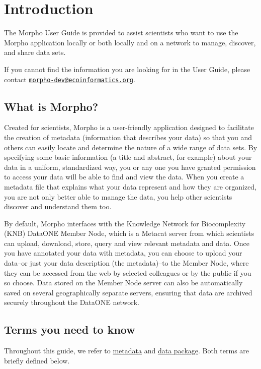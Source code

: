 \section{Introduction}

The Morpho User Guide is provided to assist scientists who want to use
the Morpho application locally or both locally and on a network to
manage, discover, and share data sets.

If you cannot find the information you are looking for in the User
Guide, please contact \href{mailto:morpho-dev@ecoinformatics.org}
{\nolinkurl{morpho-dev@ecoinformatics.org}}.

\subsection{What is Morpho?}

Created for scientists, Morpho is a user-friendly application designed
to facilitate the creation of metadata (information that describes your
data) so that you and others can easily locate and determine the nature
of a wide range of data sets. By specifying some basic information (a
title and abstract, for example) about your data in a uniform,
standardized way, you or any one you have granted permission to access
your data will be able to find and view the data. When you create a
metadata file that explains what your data represent and how they are
organized, you are not only better able to manage the data, you help
other scientists discover and understand them too. 

By default, Morpho interfaces with the Knowledge Network for Biocomplexity (KNB)
DataONE Member Node, which is a Metacat server from which scientists can
upload, download, store, query and view relevant metadata and data. Once
you have annotated your data with metadata, you can choose to upload
your data--or just your data description (the metadata)--to the Member 
Node, where they can be accessed from the web by selected colleagues
or by the public if you so choose. Data stored on the Member Node server
can also be automatically saved on several geographically separate servers, 
ensuring that data are archived securely throughout the DataONE network.

\subsection{Terms you need to know}

Throughout this guide, we refer to \hyperref[sec:metadata]{metadata}
and \hyperref[sec:data package]{data package}. Both terms are briefly
defined below.

